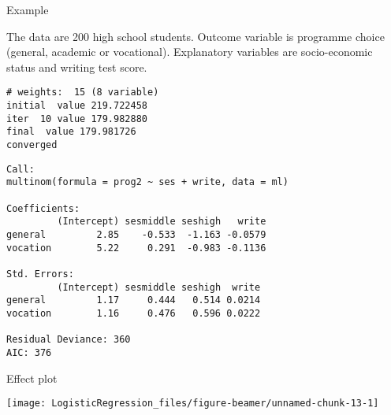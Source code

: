 \documentclass[10pt,ignorenonframetext,]{beamer}
\begin{document}
\begin{frame}[fragile]{Example}

The data are 200 high school students. Outcome variable is programme
choice (general, academic or vocational). Explanatory variables are
socio-economic status and writing test score.

\begin{verbatim}
# weights:  15 (8 variable)
initial  value 219.722458
iter  10 value 179.982880
final  value 179.981726
converged
\end{verbatim}

\begin{verbatim}
Call:
multinom(formula = prog2 ~ ses + write, data = ml)

Coefficients:
         (Intercept) sesmiddle seshigh   write
general         2.85    -0.533  -1.163 -0.0579
vocation        5.22     0.291  -0.983 -0.1136

Std. Errors:
         (Intercept) sesmiddle seshigh  write
general         1.17     0.444   0.514 0.0214
vocation        1.16     0.476   0.596 0.0222

Residual Deviance: 360
AIC: 376
\end{verbatim}

\end{frame}

\begin{frame}{Effect plot}

\begin{center}\texttt{[image: LogisticRegression\_files/figure-beamer/unnamed-chunk-13-1]} \end{center}

\end{frame}
\end{document}

